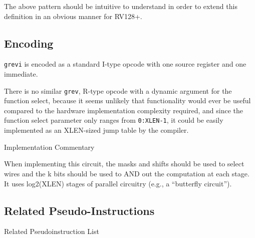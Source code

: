 The above pattern should be intuitive to understand in order to extend
this definition in an obvious manner for RV128+.

\subsection{Encoding}\label{encoding-2}



\texttt{grevi} is encoded as a standard I-type opcode with one source
register and one immediate.

There is no similar \texttt{grev}, R-type opcode with a dynamic argument
for the function select, because it seems unlikely that functionality
would ever be useful compared to the hardware implementation complexity
required, and since the function select parameter only ranges from
\texttt{0:XLEN-1}, it could be easily implemented as an XLEN-sized jump
table by the compiler.

Implementation Commentary

When implementing this circuit, the masks and shifts should be used to
select wires and the k bits should be used to AND out the computation at
each stage. It uses log2(XLEN) stages of parallel circuitry (e.g., a
``butterfly circuit'').

\subsection{Related
Pseudo-Instructions}\label{related-pseudo-instructions-2}

Related Pseudoinstruction List

